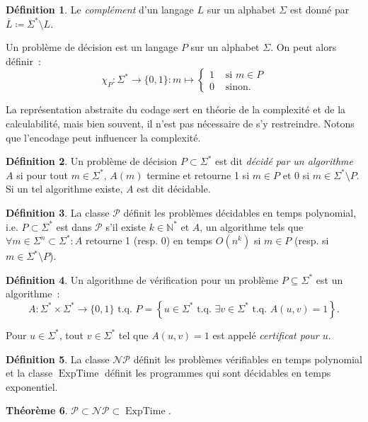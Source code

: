 \documentclass{article}
\newtheorem{thm}{Théorème}[section]
\theoremstyle{definition}
\newtheorem{déf}[thm]{Définition}
\theoremstyle{remark}
\newcommand{\N}{\mathbb N}
\newcommand{\tq}{\text{ t.q. }}
\newcommand{\NP}{\mathcal {NP}}
\DeclareMathOperator{\ExpTime}{ExpTime}
\begin{document}
	\begin{déf} Le \textit{complément} d'un langage $L$ sur un alphabet $\Sigma$ est donné par $\overline L \coloneqq \Sigma^* \setminus L$.
	\end{déf}

	Un problème de décision est un langage $P$ sur un alphabet $\Sigma$. On peut alors définir~:
	\[\chi_P : \Sigma^* \to \{0, 1\} : m \mapsto \begin{cases}1 &\text{ si } m \in P \\0 &\text{ sinon}.\end{cases}\]

	La représentation abstraite du codage sert en théorie de la complexité et de la calculabilité, mais bien souvent, il n'est pas nécessaire de s'y restreindre.
	Notons que l'encodage peut influencer la complexité.

	\begin{déf} Un problème de décision $P \subset \Sigma^*$ est dit \textit{décidé par un algorithme $A$} si pour tout $m \in \Sigma^*$,
	$A(m)$ termine et retourne 1 si $m \in P$ et 0 si $m \in \Sigma^* \setminus P$. Si un tel algorithme existe, $A$ est dit décidable.
	\end{déf}

	\begin{déf} La classe $\mathcal P$ définit les problèmes décidables en temps polynomial, i.e. $P \subset \Sigma^*$ est dans $\mathcal P$ s'il existe
	$k \in \N^*$ et $A$, un algorithme tels que $\forall m \in \Sigma^n \subset \Sigma^* : A$ retourne 1 (resp. 0) en temps $O(n^k)$ si
	$m \in P$ (resp. si $m \in \Sigma^* \setminus P$).
	\end{déf}

	\begin{déf} Un algorithme de vérification pour un problème $P \subseteq \Sigma^*$ est un algorithme~:
	\[A : \Sigma^* \times \Sigma^* \to \{0, 1\} \tq P = \left\{u \in \Sigma^* \tq \exists v \in \Sigma^* \tq A(u, v) = 1\right\}.\]

	Pour $u \in \Sigma^*$, tout $v \in \Sigma^*$ tel que $A(u, v) = 1$ est appelé \textit{certificat pour $u$}.
	\end{déf}

	\begin{déf} La classe $\NP$ définit les problèmes vérifiables en temps polynomial et la classe $\ExpTime$ définit les programmes qui sont décidables
	en temps exponentiel.
	\end{déf}

	\begin{thm} $\mathcal P \subset \NP \subset \ExpTime$.
	\end{thm}
\end{document}
